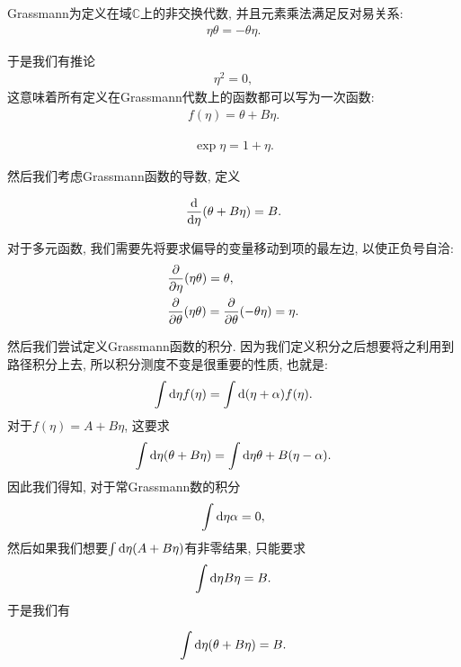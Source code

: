 \begin{definition}[Grassmann代数]
    Grassmann为定义在域$\mathbb C$上的非交换代数, 并且元素乘法满足反对易关系:
    \begin{align}
        \eta\theta=-\theta\eta.
    \end{align}
\end{definition}
于是我们有推论
\begin{align}
    \eta^2=0,
\end{align}
这意味着所有定义在Grassmann代数上的函数都可以写为一次函数:
\begin{align}
    f(\eta)=\theta+B\eta.
\end{align}
\begin{example}
    \begin{align}
        \exp{\eta}=1+\eta.
    \end{align}
\end{example}

然后我们考虑Grassmann函数的导数, 定义
\begin{definition}[Grassmann函数的导数]
    \begin{align}
        \frac{\mathrm d}{\mathrm d\eta}(\theta+B\eta)=B.
    \end{align}
\end{definition}
对于多元函数, 我们需要先将要求偏导的变量移动到项的最左边, 以使正负号自洽:
\begin{align}
    &\frac{\partial }{\partial \eta}(\eta\theta)=\theta, \\
    &\frac{\partial }{\partial \theta}(\eta\theta)=\frac{\partial }{\partial \theta}(-\theta\eta)=\eta.
\end{align}

然后我们尝试定义Grassmann函数的积分. 因为我们定义积分之后想要将之利用到路径积分上去, 所以积分测度不变是很重要的性质, 也就是:
\begin{align}
    \int\mathrm d\eta f(\eta)=\int\mathrm d(\eta+\alpha) f(\eta).
\end{align}
对于$f(\eta)=A+B\eta$, 这要求
\begin{align}
    \int\mathrm d\eta (\theta+B\eta)=\int\mathrm d\eta \theta+B(\eta-\alpha).
\end{align}
因此我们得知, 对于常Grassmann数的积分
\begin{align}
    \int\mathrm d\eta\alpha=0,
\end{align}
然后如果我们想要$\int\mathrm d\eta(A+B\eta)$有非零结果, 只能要求
\begin{align}
    \int\mathrm d\eta B\eta=B.
\end{align}
于是我们有
\begin{definition}[Grassmann函数的积分]
    \begin{align}
        \int\mathrm d\eta(\theta+B\eta)=B.
    \end{align}
\end{definition}

